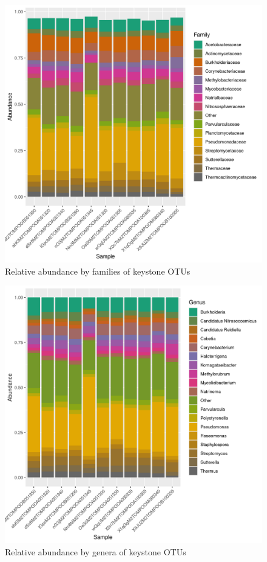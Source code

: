 \begin{figure}
\centering
\includegraphics[scale = 0.8]{tomate_aleatorio1_9.csv_relative_abundance_Family.png}
\caption{Relative abundance by families of keystone OTUs }
\label{fig:tomate_aleatorio1_9.csv_family}
\end{figure}
\begin{figure}
\centering
\includegraphics[scale = 0.8]{tomate_aleatorio1_9.csv_relative_abundance_Genus.png}
\caption{Relative abundance by genera of keystone OTUs }
\label{fig:tomate_aleatorio1_9.csv_genus}
\end{figure}
